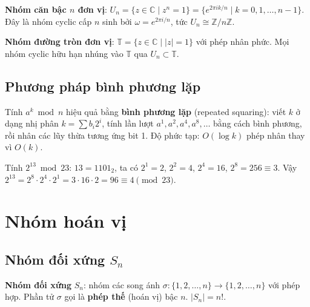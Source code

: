 \documentclass[12pt,a4paper]{article}
\begin{document}
\begin{dinhnghia}
  \textbf{Nhóm căn bậc $n$ đơn vị}: $U_n = \{z \in \mathbb{C} \mid z^n = 1\} = \{e^{2\pi i k/n} \mid k = 0, 1, \ldots, n-1\}$. Đây là nhóm cyclic cấp $n$ sinh bởi $\omega = e^{2\pi i/n}$, tức $U_n \cong \mathbb{Z}/n\mathbb{Z}$.
\end{dinhnghia}

\begin{dinhnghia}
  \textbf{Nhóm đường tròn đơn vị}: $\mathbb{T} = \{z \in \mathbb{C} \mid |z| = 1\}$ với phép nhân phức. Mọi nhóm cyclic hữu hạn nhúng vào $\mathbb{T}$ qua $U_n \subset \mathbb{T}$.
\end{dinhnghia}

\subsection{Phương pháp bình phương lặp}

\begin{phuongphap}
  Tính $a^k \bmod n$ hiệu quả bằng \textbf{bình phương lặp} (repeated squaring): viết $k$ ở dạng nhị phân $k = \sum b_i 2^i$, tính lần lượt $a^1, a^2, a^4, a^8, \ldots$ bằng cách bình phương, rồi nhân các lũy thừa tương ứng bit 1. Độ phức tạp: $O(\log k)$ phép nhân thay vì $O(k)$.
\end{phuongphap}

\begin{vidu}
  Tính $2^{13} \bmod 23$: $13 = 1101_2$, ta có $2^1 = 2$, $2^2 = 4$, $2^4 = 16$, $2^8 = 256 \equiv 3$. Vậy $2^{13} = 2^8 \cdot 2^4 \cdot 2^1 = 3 \cdot 16 \cdot 2 = 96 \equiv 4 \pmod{23}$.
\end{vidu}

\section{Nhóm hoán vị}

\subsection{Nhóm đối xứng $S_n$}

\begin{dinhnghia}
  \textbf{Nhóm đối xứng} $S_n$: nhóm các song ánh $\sigma: \{1,2,\ldots,n\} \to \{1,2,\ldots,n\}$ với phép hợp. Phần tử $\sigma$ gọi là \textbf{phép thế} (hoán vị) bậc $n$. $|S_n| = n!$.
\end{dinhnghia}
\end{document}
